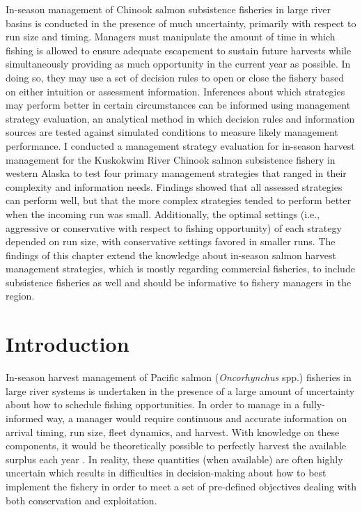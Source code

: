 \documentclass[12pt,]{book}
\theoremstyle{definition}
\theoremstyle{definition}
\theoremstyle{definition}
\theoremstyle{remark}
\begin{document}
\noindent
In-season management of Chinook salmon subsistence fisheries in large
river basins is conducted in the presence of much uncertainty, primarily
with respect to run size and timing. Managers must manipulate the amount
of time in which fishing is allowed to ensure adequate escapement to
sustain future harvests while simultaneously providing as much
opportunity in the current year as possible. In doing so, they may use a
set of decision rules to open or close the fishery based on either
intuition or assessment information. Inferences about which strategies
may perform better in certain circumstances can be informed using
management strategy evaluation, an analytical method in which decision
rules and information sources are tested against simulated conditions to
measure likely management performance. I conducted a management strategy
evaluation for in-season harvest management for the Kuskokwim River
Chinook salmon subsistence fishery in western Alaska to test four
primary management strategies that ranged in their complexity and
information needs. Findings showed that all assessed strategies can
perform well, but that the more complex strategies tended to perform
better when the incoming run was small. Additionally, the optimal
settings (i.e., aggressive or conservative with respect to fishing
opportunity) of each strategy depended on run size, with conservative
settings favored in smaller runs. The findings of this chapter extend
the knowledge about in-season salmon harvest management strategies,
which is mostly regarding commercial fisheries, to include subsistence
fisheries as well and should be informative to fishery managers in the
region.

\newpage

\section{Introduction}\label{introduction-1}

\noindent
In-season harvest management of Pacific salmon (\emph{Oncorhynchus}
spp.) fisheries in large river systems is undertaken in the presence of
a large amount of uncertainty about how to schedule fishing
opportunities. In order to manage in a fully-informed way, a manager
would require continuous and accurate information on arrival timing, run
size, fleet dynamics, and harvest. With knowledge on these components,
it would be theoretically possible to perfectly harvest the available
surplus each year \citep{adkison-cunningham-2015}. In reality, these
quantities (when available) are often highly uncertain
\citep{adkison-peterman-2000, flynn-hilborn-2004, hyun-etal-2012} which
results in difficulties in decision-making about how to best implement
the fishery in order to meet a set of pre-defined objectives dealing
with both conservation and exploitation.
\end{document}
